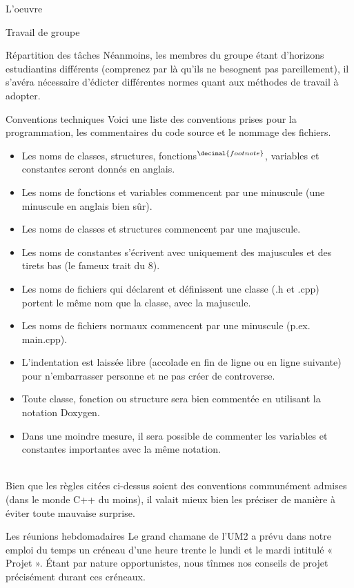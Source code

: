 \documentclass[a4paper, 12pt]{report}
\begin{document}
\begin{part}{L'oeuvre}
\begin{chapter}{Travail de groupe}
\begin{section}{Répartition des tâches}
				Néanmoins, les membres du groupe étant d'horizons estudiantins différents (comprenez par là qu'ils ne besognent pas pareillement),
				il s'avéra nécessaire d'édicter différentes normes quant aux méthodes de travail à adopter.

			\end{section}
			\begin{section}{Conventions techniques}
				Voici une liste des conventions prises pour la programmation, les commentaires du code source et le nommage des fichiers.
				\addtocounter{footnote}{2}
				\footnotetext[\value{footnote}]{Le nom de fonction désigne aussi les méthodes.}
				\begin{itemize}
					\item Les noms de classes, structures, fonctions$^{\decimal{footnote}}$, variables et constantes seront donnés en anglais.
					\item Les noms de fonctions et variables commencent par une minuscule (une minuscule en anglais bien sûr).
					\item Les noms de classes et structures commencent par une majuscule.
					\item Les noms de constantes s'écrivent avec uniquement des majuscules et des tirets bas (le fameux trait du 8).
					\item Les noms de fichiers qui déclarent et définissent une classe (.h et .cpp) portent le même nom que la classe, avec la
					majuscule.
					\item Les noms de fichiers normaux commencent par une minuscule (p.ex. main.cpp).
					\item L'indentation est laissée libre (accolade en fin de ligne ou en ligne suivante) pour n'embarrasser personne et ne pas
					créer de controverse.
					\item Toute classe, fonction ou structure sera bien commentée en utilisant la notation \gls{Doxygen}.
					\item Dans une moindre mesure, il sera possible de commenter les variables et constantes importantes avec la même notation.
				\end{itemize}~\\

				Bien que les règles citées ci-dessus soient des conventions communément admises (dans le monde \gls{C++} du moins), il valait mieux
				bien les préciser de manière à éviter toute mauvaise surprise.
			\end{section}
			\begin{section}{Les réunions hebdomadaires}
				Le grand chamane de l'UM2 a prévu dans notre emploi du temps un créneau d'une heure trente le lundi et le mardi intitulé « Projet ».
				Étant par nature opportunistes, nous tînmes nos conseils de projet précisément durant ces créneaux.\\



\end{section}
\end{chapter}
\end{part}
\end{document}
